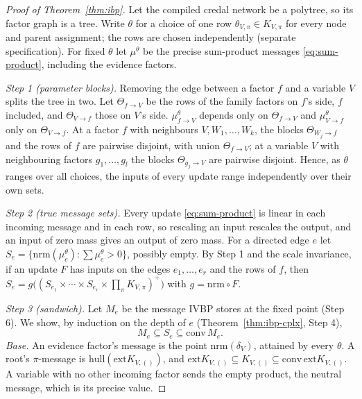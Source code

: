 \documentclass{article} %
\newcommand{\ext}{\mathrm{ext}}
\begin{document}
\begin{proof}[Proof of Theorem~\ref{thm:ibp}]
Let the compiled credal network be a polytree, so its factor graph is a tree. Write
$\theta$ for a choice of one row $\theta_{V,\pi}\in K_{V,\pi}$ for every node and parent
assignment; the rows are chosen independently (separate specification). For fixed $\theta$
let $\mu^\theta$ be the precise sum-product messages \eqref{eq:sum-product}, including the
evidence factors.

\emph{Step 1 (parameter blocks).} Removing the edge between a factor $f$ and a variable $V$
splits the tree in two. Let $\Theta_{f\to V}$ be the rows of the family factors on $f$'s
side, $f$ included, and $\Theta_{V\to f}$ those on $V$'s side. $\mu^\theta_{f\to V}$
depends only on $\Theta_{f\to V}$ and $\mu^\theta_{V\to f}$ only on $\Theta_{V\to f}$. At
a factor $f$ with neighbours $V,W_1,\dots,W_k$, the blocks $\Theta_{W_j\to f}$ and the rows
of $f$ are pairwise disjoint, with union $\Theta_{f\to V}$; at a variable $V$ with
neighbouring factors $g_1,\dots,g_l$ the blocks $\Theta_{g_j\to V}$ are pairwise disjoint.
Hence, as $\theta$ ranges over all choices, the inputs of every update range independently
over their own sets.

\emph{Step 2 (true message sets).} Every update \eqref{eq:sum-product} is linear in each
incoming message and in each row, so rescaling an input rescales the output, and an input of
zero mass gives an output of zero mass. For a directed edge $e$ let
$S_e=\{\mathrm{nrm}(\mu^\theta_e):\sum\mu^\theta_e>0\}$, possibly empty. By Step 1 and the
scale invariance, if an update $F$ has inputs on the edges $e_1,\dots,e_r$ and the rows of
$f$, then $S_e=g\bigl((S_{e_1}\times\cdots\times S_{e_r}\times\prod_\pi K_{V,\pi})^+\bigr)$ with
$g=\mathrm{nrm}\circ F$.

\emph{Step 3 (sandwich).} Let $M_e$ be the message IVBP stores at the fixed point (Step 6).
We show, by induction on the depth of $e$ (Theorem~\ref{thm:ibp-cplx}, Step 4),
\[
  M_e\subseteq S_e\subseteq\mathrm{conv}\,M_e .
\]
\emph{Base.} An evidence factor's message is the point $\mathrm{nrm}(\delta_V)$, attained by
every $\theta$. A root's $\pi$-message is $\mathrm{hull}(\ext K_{V,()})$, and
$\ext K_{V,()}\subseteq K_{V,()}\subseteq\mathrm{conv}\,\ext K_{V,()}$. A variable with no other
incoming factor sends the empty product, the neutral message, which is its precise value.


\end{proof}
\end{document}
